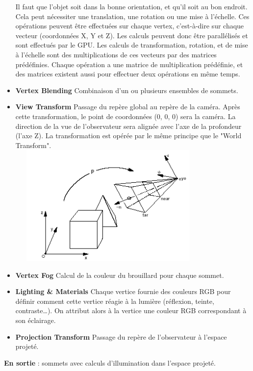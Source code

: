 \begin{itemize}
Il faut que l’objet soit dans la bonne orientation, et qu’il soit au bon endroit. Cela peut nécessiter une translation, une rotation ou une mise à l’échelle. Ces opérations peuvent être effectuées sur chaque vertex, c’est-à-dire sur chaque vecteur (coordonnées X, Y et Z). Les calculs peuvent donc être parallélisés et sont effectués par le GPU. Les calculs de transformation, rotation, et de mise à l’échelle sont des multiplications de ces vecteurs par des matrices prédéfinies. Chaque opération a une matrice de multiplication prédéfinie, et des matrices existent aussi pour effectuer deux opérations en même temps.
\\
	\item{\textbf{Vertex Blending}}
Combinaison d’un ou plusieurs ensembles de sommets.
\\
	\item{\textbf{View Transform}}
Passage du repère global au repère de la caméra. Après cette transformation, le point de coordonnées (0, 0, 0) sera la caméra. La direction de la vue de l’observateur sera alignée avec l'axe de la profondeur (l'axe Z). La transformation est opérée par le même principe que le "World Transform".
\\
\includegraphics[width=10cm,height=60mm]{leo/images/repereCamera.png}
\\
	\item{\textbf{Vertex Fog}}
Calcul de la couleur du brouillard pour chaque sommet.
\\
	\item{\textbf{Lighting \& Materials}}
Chaque vertice fournie des couleurs RGB pour définir comment cette vertice réagie à la lumière (réflexion, teinte, contraste…). On attribut alors à la vertice une couleur RGB correspondant à son éclairage.
\\
	\item{\textbf{Projection Transform}}
Passage du repère de l'observateur à l'espace projeté.
\\
\end{itemize}
\textbf{En sortie} : sommets avec calculs d’illumination dans l’espace projeté.

